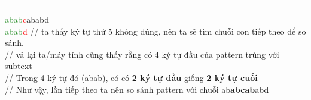 \documentclass[a4paper,11pt]{article}
\begin{document}
\begin{enumerate}
			\vspace*{2mm}
			\hrule
			\textcolor{ForestGreen}{abab}\textcolor{red}{c}ababd\\
			\textcolor{ForestGreen}{abab}\textcolor{red}{d}			\hspace*{1.8cm} // ta thấy ký tự thứ 5 không đúng, nên ta sẽ tìm chuỗi con tiếp theo để so sánh. \\
																	\hspace*{2.9cm} // vả lại ta/máy tính cũng thấy rằng có 4 ký tự đầu của pattern trùng với subtext \\
																	\hspace*{2.9cm} // Trong 4 ký tự đó (abab), có có \textbf{2 ký tự đầu} giống \textbf{2 ký tự cuối} \\
																	\hspace*{2.9cm} // Như vậy, lần tiếp theo ta nên so sánh pattern với chuỗi ab\textbf{abcab}abd 
																	

\end{enumerate}
\end{document}
